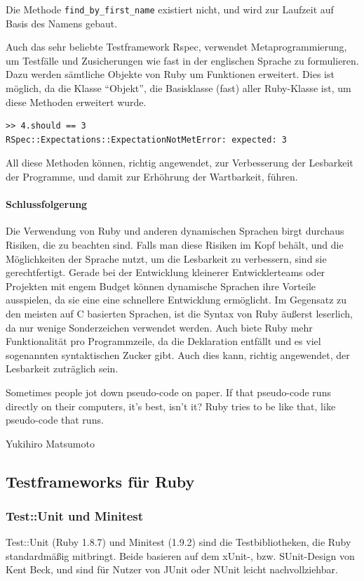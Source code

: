 Die Methode \texttt{find\_by\_first\_name} existiert nicht, und wird zur Laufzeit auf Basis des Namens gebaut.

Auch das sehr beliebte Testframework Rspec, verwendet Metaprogrammierung, um Testfälle und Zusicherungen wie fast in der englischen Sprache zu formulieren. Dazu werden sämtliche Objekte von Ruby um Funktionen erweitert. Dies ist möglich, da die Klasse "`Objekt"', die Basisklasse (fast) aller Ruby-Klasse ist, um diese Methoden erweitert wurde.

\begin{lstlisting}
>> 4.should == 3
RSpec::Expectations::ExpectationNotMetError: expected: 3
\end{lstlisting}

All diese Methoden können, richtig angewendet, zur Verbesserung der Lesbarkeit der Programme, und damit zur Erhöhrung der Wartbarkeit, führen.

\paragraph{Schlussfolgerung}

Die Verwendung von Ruby und anderen dynamischen Sprachen birgt durchaus Risiken, die zu beachten sind. Falls man diese Risiken im Kopf behält, und die Möglichkeiten der Sprache nutzt, um die Lesbarkeit zu verbessern, sind sie gerechtfertigt. Gerade bei der Entwicklung kleinerer Entwicklerteams oder Projekten mit engem Budget können dynamische Sprachen ihre Vorteile ausspielen, da sie eine eine schnellere Entwicklung ermöglicht. Im Gegensatz zu den meisten auf C basierten Sprachen, ist die Syntax von Ruby äußerst leserlich, da nur wenige Sonderzeichen verwendet werden. Auch biete Ruby mehr Funktionalität pro Programmzeile, da die Deklaration entfällt und es viel sogenannten syntaktischen Zucker gibt. Auch dies kann, richtig angewendet, der Lesbarkeit zuträglich sein.
\epigraph{Sometimes people jot down pseudo-code on paper. If that pseudo-code runs directly on their computers, it's best, isn't it? Ruby tries to be like that, like pseudo-code that runs. }{Yukihiro Matsumoto}


\subsection{Testframeworks für Ruby}
\subsubsection{Test::Unit und Minitest}
Test::Unit (Ruby 1.8.7) und Minitest (1.9.2) sind die Testbibliotheken, die Ruby standardmäßig mitbringt. Beide basieren auf dem xUnit-, bzw. SUnit-Design von Kent Beck, und sind für Nutzer von JUnit oder NUnit leicht nachvollziehbar. %

